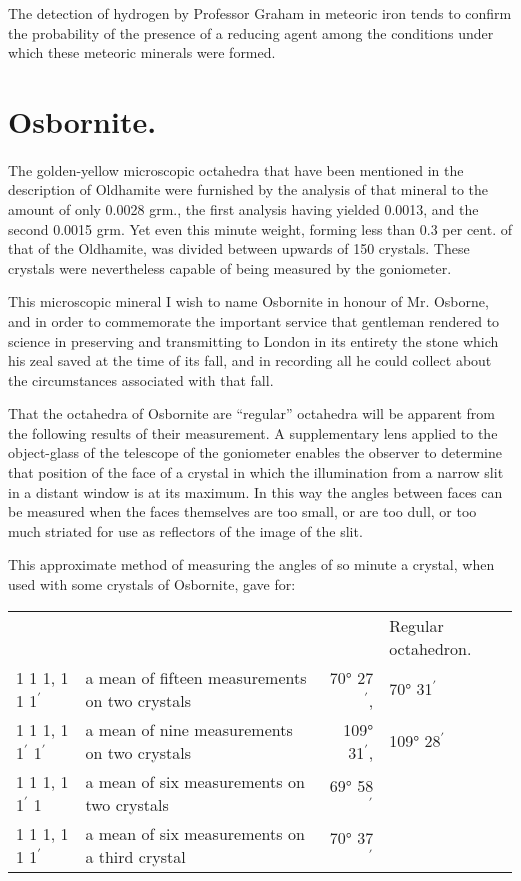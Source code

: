 \documentclass[a4paper, 12pt, oneside]{article}
\begin{document}
The detection of hydrogen by Professor Graham in meteoric iron tends to confirm the probability of the presence of a reducing agent among the conditions under which these meteoric minerals were formed.
\clearpage
\section{Osbornite.}
\paragraph{}
The golden-yellow microscopic octahedra that have been mentioned in the description of Oldhamite were furnished by the analysis of that mineral to the amount of only 0.0028 grm., the first analysis having yielded 0.0013, and the second 0.0015 grm. Yet even this minute weight, forming less than 0.3 per cent. of that of the Oldhamite, was divided between upwards of 150 crystals. These crystals were nevertheless capable of being measured by the goniometer.

This microscopic mineral I wish to name Osbornite in honour of Mr. Osborne, and in order to commemorate the important service that gentleman rendered to science in preserving and transmitting to London in its entirety the stone which his zeal saved at the time of its fall, and in recording all he could collect about the circumstances associated with that fall.

That the octahedra of Osbornite are ``regular'' octahedra will be apparent from the following results of their measurement. A supplementary lens applied to the object-glass of the telescope of the goniometer enables the observer to determine that position of the face of a crystal in which the illumination from a narrow slit in a distant window is at its maximum. In this way the angles between faces can be measured when the faces themselves are too small, or are too dull, or too much striated for use as reflectors of the image of the slit.

This approximate method of measuring the angles of so minute a crystal, when used with some crystals of Osbornite, gave for:
\begin{table}[H]
    \centering
    \footnotesize
    \begin{tabular}{l l r p{13mm}}
        ~ & ~ & ~ & Regular octahedron. \\
        1 1 1, 1 1 1$^{\prime}$ & a mean of fifteen measurements on two crystals & 70° 27$^{\prime}$, & 70° 31$^{\prime}$\\
        1 1 1, 1 1$^{\prime}$ 1$^{\prime}$ & a mean of nine measurements on two crystals & 109° 31$^{\prime}$, & 109° 28$^{\prime}$\\
        1 1 1, 1 1$^{\prime}$ 1 & a mean of six measurements on two crystals & 69° 58$^{\prime}$ & ~ \\
        1 1 1, 1 1 1$^{\prime}$ & a mean of six measurements on a third crystal & 70° 37$^{\prime}$ & ~\\
    \end{tabular}
\end{table}
\end{document}
